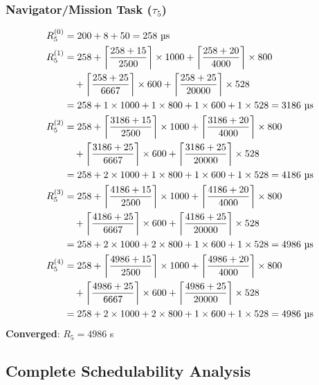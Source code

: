 \documentclass[11pt]{article}
\begin{document}
\subsubsection{Navigator/Mission Task ($\tau_5$)}
\begin{align}
R_5^{(0)} &= 200 + 8 + 50 = 258 \text{ \textmu s}\\
R_5^{(1)} &= 258 + \left\lceil \frac{258 + 15}{2500} \right\rceil \times 1000 + \left\lceil \frac{258 + 20}{4000} \right\rceil \times 800\\
&\quad + \left\lceil \frac{258 + 25}{6667} \right\rceil \times 600 + \left\lceil \frac{258 + 25}{20000} \right\rceil \times 528\\
&= 258 + 1 \times 1000 + 1 \times 800 + 1 \times 600 + 1 \times 528 = 3186 \text{ \textmu s}\\
R_5^{(2)} &= 258 + \left\lceil \frac{3186 + 15}{2500} \right\rceil \times 1000 + \left\lceil \frac{3186 + 20}{4000} \right\rceil \times 800\\
&\quad + \left\lceil \frac{3186 + 25}{6667} \right\rceil \times 600 + \left\lceil \frac{3186 + 25}{20000} \right\rceil \times 528\\
&= 258 + 2 \times 1000 + 1 \times 800 + 1 \times 600 + 1 \times 528 = 4186 \text{ \textmu s}\\
R_5^{(3)} &= 258 + \left\lceil \frac{4186 + 15}{2500} \right\rceil \times 1000 + \left\lceil \frac{4186 + 20}{4000} \right\rceil \times 800\\
&\quad + \left\lceil \frac{4186 + 25}{6667} \right\rceil \times 600 + \left\lceil \frac{4186 + 25}{20000} \right\rceil \times 528\\
&= 258 + 2 \times 1000 + 2 \times 800 + 1 \times 600 + 1 \times 528 = 4986 \text{ \textmu s}\\
R_5^{(4)} &= 258 + \left\lceil \frac{4986 + 15}{2500} \right\rceil \times 1000 + \left\lceil \frac{4986 + 20}{4000} \right\rceil \times 800\\
&\quad + \left\lceil \frac{4986 + 25}{6667} \right\rceil \times 600 + \left\lceil \frac{4986 + 25}{20000} \right\rceil \times 528\\
&= 258 + 2 \times 1000 + 2 \times 800 + 1 \times 600 + 1 \times 528 = 4986 \text{ \textmu s}
\end{align}
\textbf{Converged}: $R_5 = 4986$ \textmu s

\subsection{Complete Schedulability Analysis}
\end{document}
